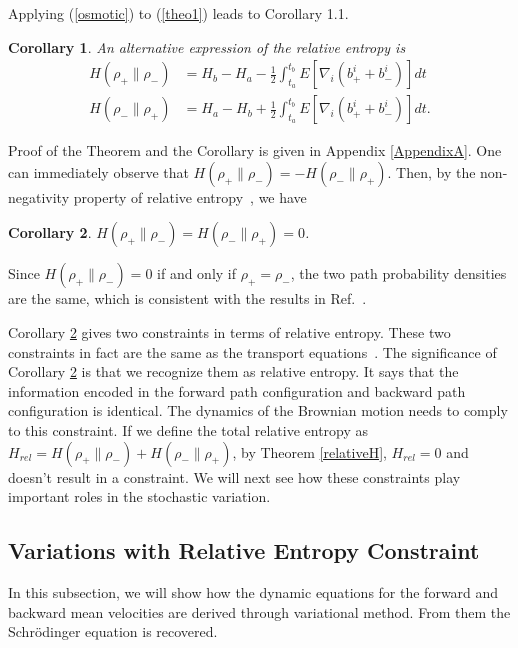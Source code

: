 \documentclass[%
 aip, 
 amsmath,amssymb,amsthm,
 nofootinbib,
 reprint,
]{revtex4-1}
\newtheorem{corollary}{Corollary}[theorem]
\begin{document}
Applying (\ref{osmotic}) to (\ref{theo1}) leads to Corollary 1.1. 
\begin{corollary}
\label{cor1}
An alternative expression of the relative entropy is
\begin{equation}
\label{theo1_2}
\begin{split}
     H(\rho_+\|\rho_-) &= H_b - H_a - \frac{1}{2}\int_{t_a}^{t_b} E[\nabla_i(b_+^i + b_-^i)]dt \\
     H(\rho_-\|\rho_+) &= H_a - H_b + \frac{1}{2}\int_{t_a}^{t_b} E[\nabla_i(b_+^i + b_-^i)]dt.
\end{split}
\end{equation}
\end{corollary}
Proof of the Theorem and the Corollary is given in Appendix \ref{AppendixA}. One can immediately observe that $H(\rho_+\|\rho_-)=-H(\rho_-\|\rho_+)$. Then, by the non-negativity property of relative entropy~\cite{Nelson00}, we have
\begin{corollary}
\label{cor2}
$H(\rho_+\|\rho_-) = H(\rho_-\|\rho_+) = 0$.
\end{corollary}
Since $H(\rho_+\|\rho_-)=0$ if and only if $\rho_+=\rho_-$, the two path probability densities are the same, which is consistent with the results in Ref.~\cite{Nelsonbook}. 

Corollary \ref{cor2} gives two constraints in terms of relative entropy. These two constraints in fact are the same as the transport equations~\cite{Guerra}. The significance of Corollary \ref{cor2} is that we recognize them as relative entropy. It says that the information encoded in the forward path configuration and backward path configuration is identical. The dynamics of the Brownian motion needs to comply to this constraint. If we define the total relative entropy as $H_{rel}=H(\rho_+\|\rho_-) + H(\rho_-\|\rho_+)$, by Theorem \ref{relativeH}, $H_{rel}=0$ and doesn't result in a constraint. We will next see how these constraints play important roles in the stochastic variation.

\subsection{Variations with Relative Entropy Constraint}
\label{subsec:var1}
In this subsection, we will show how the dynamic equations for the forward and backward mean velocities are derived through variational method. From them the Schr\"{o}dinger equation is recovered.
\end{document}
